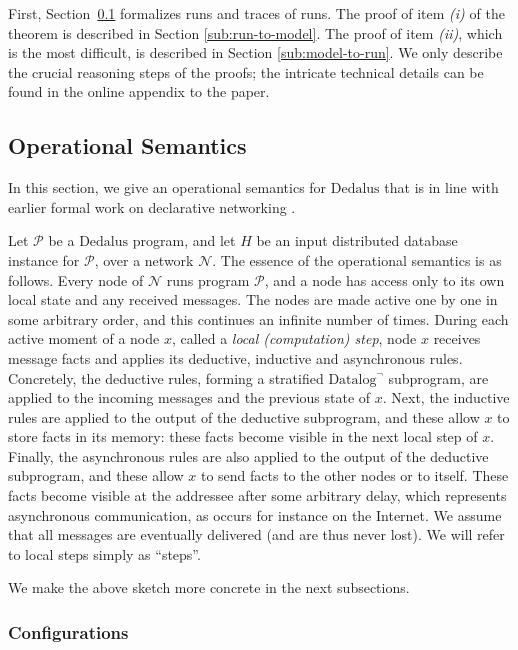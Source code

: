\documentclass{tlp}
\newcommand{\langname}[1]{\text{#1}}  \newcommand{\pred}[1]{\mathtt{#1}}  \newcommand{\fname}[1]{\mathit{#1}}  \newcommand{\sq}[1]{`{#1}'}
\newcommand{\dedalus}{\langname{Dedalus}}
\newcommand{\datalogneg}{\langname{Datalog}^{\neg}}
\newcommand{\ded}{\mathcal{P}}
\newcommand{\nw}{\mathcal{N}}
\begin{document}
First, Section~\ref{sub:operational-semantics} formalizes runs and
traces of runs. The proof of item \emph{(i)} of the theorem is described
in Section \ref{sub:run-to-model}. The proof of item \emph{(ii)},
which is the most difficult, is described in Section \ref{sub:model-to-run}.
We only describe the crucial reasoning steps of the proofs; the intricate
technical details can be found in the online appendix to the paper.


\subsection{Operational Semantics}

\label{sub:operational-semantics}

In this section, we give an operational semantics for $\dedalus$
that is in line with earlier formal work on declarative networking
\cite{deutsch_network,declnetw_opsem,grumbach_netlog,rtdn_pods,webdamlog}. 

Let $\ded$ be a $\dedalus$ program, and let $H$ be an input distributed
database instance for $\ded$, over a network $\nw$. The essence
of the operational semantics is as follows. Every node of $\nw$ runs
program $\ded$, and a node has access only to its own local state
and any received messages. The nodes are made active one by one in
some arbitrary order, and this continues an infinite number of times.
During each active moment of a node $x$, called a \emph{local (computation)
step}, node $x$ receives message facts and applies its deductive,
inductive and asynchronous rules. Concretely, the deductive rules,
forming a stratified $\datalogneg$ subprogram, are applied to the
incoming messages and the previous state of $x$. Next, the inductive
rules are applied to the output of the deductive subprogram, and these
allow $x$ to store facts in its memory: these facts become visible
in the next local step of $x$. Finally, the asynchronous rules are
also applied to the output of the deductive subprogram, and these
allow $x$ to send facts to the other nodes or to itself. These facts
become visible at the addressee after some arbitrary delay, which
represents asynchronous communication, as occurs for instance on the
Internet. We assume that all messages are eventually delivered (and
are thus never lost). We will refer to local steps simply as ``steps''.

We make the above sketch more concrete in the next subsections.


\subsubsection{Configurations}
\end{document}
